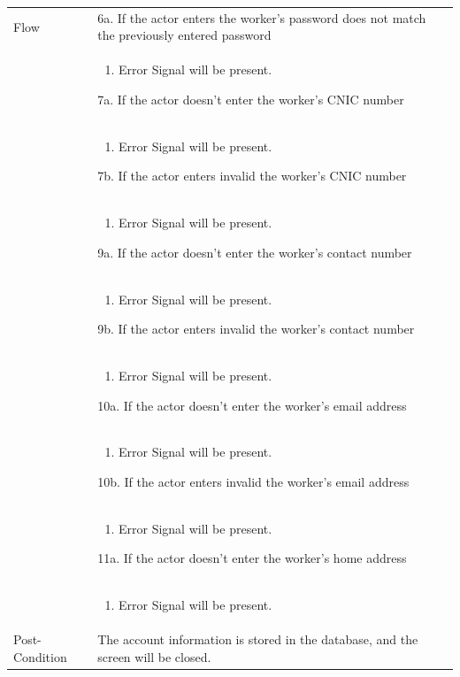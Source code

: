 \documentclass[12pt,a4paper]{report}
\begin{document}
\begin{tabular}{ | m{3cm} | m{12cm}| } \hline
Flow &
6a. If the actor enters the worker's password does not match the previously entered password \\ 	
&	\begin{enumerate}
		\item Error Signal will be present.
	\end{enumerate}


7a. If the actor doesn't enter the worker's CNIC number\\ 	
&	\begin{enumerate}
		\item Error Signal will be present.
	\end{enumerate}
7b. If the actor enters invalid the worker's CNIC number\\ 	
&	\begin{enumerate}
		\item Error Signal will be present.
	\end{enumerate}
9a. If the actor doesn't enter the worker's contact number\\ 	
&	\begin{enumerate}
		\item Error Signal will be present.
	\end{enumerate}
9b. If the actor enters invalid the worker's contact number\\ 	
&	\begin{enumerate}
		\item Error Signal will be present.
	\end{enumerate}
10a. If the actor doesn't enter the worker's email address\\ 	
&	\begin{enumerate}
		\item Error Signal will be present.
	\end{enumerate}
10b. If the actor enters invalid the worker's email address\\ 	
&	\begin{enumerate}
		\item Error Signal will be present.
	\end{enumerate}
11a. If the actor doesn't enter the worker's home address\\ 	
&	\begin{enumerate}
		\item Error Signal will be present.
	\end{enumerate}
\\ \hline
Post-Condition & The account information is stored in the database, and the screen will be closed. \\\hline
\end{tabular}
\end{document}

